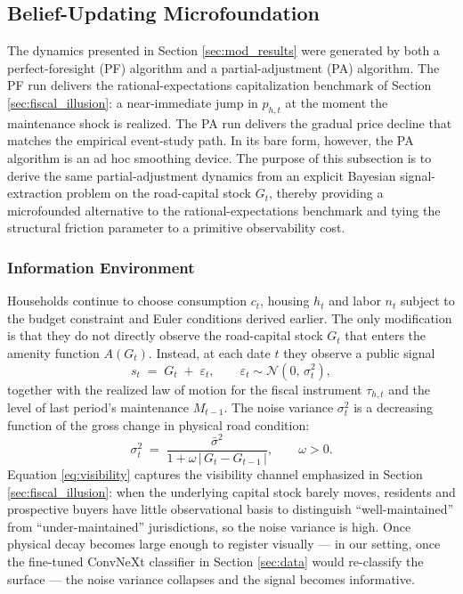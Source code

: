 
\subsection{Belief-Updating Microfoundation} \label{sec:belief_updating}

The dynamics presented in Section \ref{sec:mod_results} were generated by both a perfect-foresight (PF) algorithm and a partial-adjustment (PA) algorithm. The PF run delivers the rational-expectations capitalization benchmark of Section \ref{sec:fiscal_illusion}: a near-immediate jump in $p_{h,t}$ at the moment the maintenance shock is realized. The PA run delivers the gradual price decline that matches the empirical event-study path. In its bare form, however, the PA algorithm is an ad hoc smoothing device. The purpose of this subsection is to derive the same partial-adjustment dynamics from an explicit Bayesian signal-extraction problem on the road-capital stock $G_t$, thereby providing a microfounded alternative to the rational-expectations benchmark and tying the structural friction parameter to a primitive observability cost.

\subsubsection{Information Environment}

Households continue to choose consumption $c_t$, housing $h_t$ and labor $n_t$ subject to the budget constraint and Euler conditions derived earlier. The only modification is that they do not directly observe the road-capital stock $G_t$ that enters the amenity function $A(G_t)$. Instead, at each date $t$ they observe a public signal
\begin{equation}
s_t \;=\; G_t \;+\; \varepsilon_t,
\qquad \varepsilon_t \sim \mathcal{N}(0,\,\sigma_t^2),
\label{eq:signal}
\end{equation}
together with the realized law of motion for the fiscal instrument $\tau_{h,t}$ and the level of last period's maintenance $M_{t-1}$. The noise variance $\sigma_t^2$ is a decreasing function of the gross change in physical road condition:
\begin{equation}
\sigma_t^2 \;=\; \frac{\bar{\sigma}^2}{1 + \omega \,\big|\,G_t - G_{t-1}\,\big|},
\qquad \omega > 0.
\label{eq:visibility}
\end{equation}
Equation \ref{eq:visibility} captures the visibility channel emphasized in Section \ref{sec:fiscal_illusion}: when the underlying capital stock barely moves, residents and prospective buyers have little observational basis to distinguish ``well-maintained'' from ``under-maintained'' jurisdictions, so the noise variance is high. Once physical decay becomes large enough to register visually --- in our setting, once the fine-tuned ConvNeXt classifier in Section \ref{sec:data} would re-classify the surface --- the noise variance collapses and the signal becomes informative.

